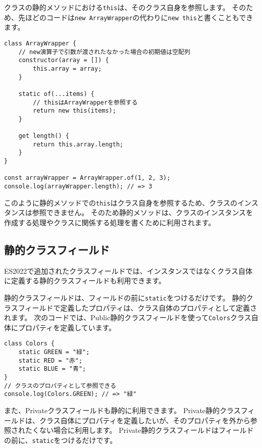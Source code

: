 クラスの静的メソッドにおける\texttt{this}は、そのクラス自身を参照します。
そのため、先ほどのコードは\texttt{new ArrayWrapper}の代わりに\texttt{new this}と書くこともできます。

\begin{lstlisting}
class ArrayWrapper {
    // new演算子で引数が渡されたなかった場合の初期値は空配列
    constructor(array = []) {
        this.array = array;
    }

    static of(...items) {
        // thisはArrayWrapperを参照する
        return new this(items);
    }

    get length() {
        return this.array.length;
    }
}

const arrayWrapper = ArrayWrapper.of(1, 2, 3);
console.log(arrayWrapper.length); // => 3
\end{lstlisting}

このように静的メソッドでの\texttt{this}はクラス自身を参照するため、クラスのインスタンスは参照できません。
そのため静的メソッドは、クラスのインスタンスを作成する処理やクラスに関係する処理を書くために利用されます。

\hypertarget{static-class-fields}{%
\subsection{静的クラスフィールド\,\protect{}}\label{static-class-fields}}

ES2022で追加されたクラスフィールドでは、インスタンスではなくクラス自体に定義する静的クラスフィールドも利用できます。

静的クラスフィールドは、フィールドの前に\texttt{static}をつけるだけです。
静的クラスフィールドで定義したプロパティは、クラス自体のプロパティとして定義されます。
次のコードでは、Public静的クラスフィールドを使って\texttt{Colors}クラス自体にプロパティを定義しています。

\begin{lstlisting}
class Colors {
    static GREEN = "緑";
    static RED = "赤";
    static BLUE = "青";
}
// クラスのプロパティとして参照できる
console.log(Colors.GREEN); // => "緑"
\end{lstlisting}

また、Privateクラスフィールドも静的に利用できます。
Private静的クラスフィールドは、クラス自体にプロパティを定義したいが、そのプロパティを外から参照されたくない場合に利用します。
Private静的クラスフィールドはフィールドの前に、\texttt{static}をつけるだけです。

